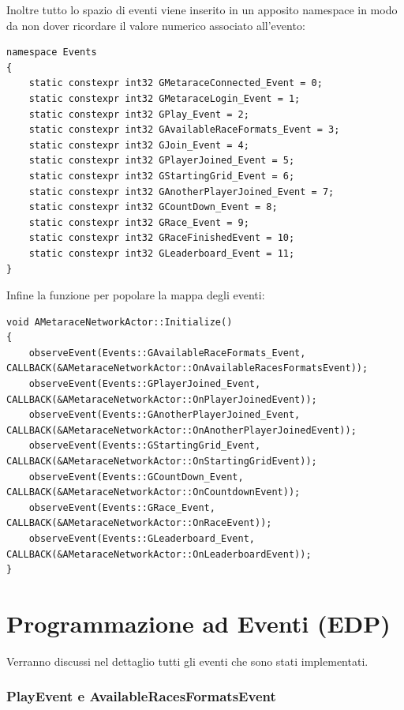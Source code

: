     Inoltre tutto lo spazio di eventi viene inserito in un apposito namespace in modo da non dover ricordare il valore numerico associato all'evento:

    \begin{lstlisting}[caption = Namespace in cui vengono definite le keys]
namespace Events
{
    static constexpr int32 GMetaraceConnected_Event = 0;
    static constexpr int32 GMetaraceLogin_Event = 1;
    static constexpr int32 GPlay_Event = 2;
    static constexpr int32 GAvailableRaceFormats_Event = 3;
    static constexpr int32 GJoin_Event = 4;
    static constexpr int32 GPlayerJoined_Event = 5;
    static constexpr int32 GStartingGrid_Event = 6;
    static constexpr int32 GAnotherPlayerJoined_Event = 7;
    static constexpr int32 GCountDown_Event = 8;
    static constexpr int32 GRace_Event = 9;
    static constexpr int32 GRaceFinishedEvent = 10;	
    static constexpr int32 GLeaderboard_Event = 11;
}
    \end{lstlisting}

    Infine la funzione per popolare la mappa degli eventi:

    \begin{lstlisting}[caption = Funzione Initialize nel NetworkActor]
void AMetaraceNetworkActor::Initialize()
{	
	observeEvent(Events::GAvailableRaceFormats_Event, CALLBACK(&AMetaraceNetworkActor::OnAvailableRacesFormatsEvent));
	observeEvent(Events::GPlayerJoined_Event, CALLBACK(&AMetaraceNetworkActor::OnPlayerJoinedEvent));
	observeEvent(Events::GAnotherPlayerJoined_Event, CALLBACK(&AMetaraceNetworkActor::OnAnotherPlayerJoinedEvent));
	observeEvent(Events::GStartingGrid_Event, CALLBACK(&AMetaraceNetworkActor::OnStartingGridEvent));
	observeEvent(Events::GCountDown_Event, CALLBACK(&AMetaraceNetworkActor::OnCountdownEvent));
	observeEvent(Events::GRace_Event, CALLBACK(&AMetaraceNetworkActor::OnRaceEvent));
	observeEvent(Events::GLeaderboard_Event, CALLBACK(&AMetaraceNetworkActor::OnLeaderboardEvent));
}
    \end{lstlisting}

    \section{Programmazione ad Eventi (EDP)}
    
    Verranno discussi nel dettaglio tutti gli eventi che sono stati implementati.

        \subsubsection{PlayEvent e AvailableRacesFormatsEvent}

